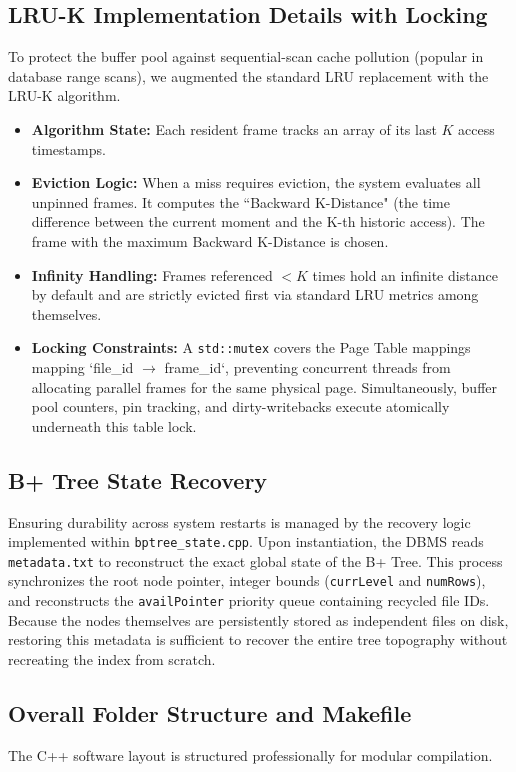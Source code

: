 \documentclass[12pt, a4paper]{article}
\begin{document}
\subsection{LRU-K Implementation Details with Locking}
To protect the buffer pool against sequential-scan cache pollution (popular in database range scans), we augmented the standard LRU replacement with the LRU-K algorithm.
\begin{itemize}
    \item \textbf{Algorithm State:} Each resident frame tracks an array of its last $K$ access timestamps.
    \item \textbf{Eviction Logic:} When a miss requires eviction, the system evaluates all unpinned frames. It computes the ``Backward K-Distance" (the time difference between the current moment and the K-th historic access). The frame with the maximum Backward K-Distance is chosen.
    \item \textbf{Infinity Handling:} Frames referenced $< K$ times hold an infinite distance by default and are strictly evicted first via standard LRU metrics among themselves.
    \item \textbf{Locking Constraints:} A \texttt{std::mutex} covers the Page Table mappings mapping `file\_id $\to$ frame\_id`, preventing concurrent threads from allocating parallel frames for the same physical page. Simultaneously, buffer pool counters, pin tracking, and dirty-writebacks execute atomically underneath this table lock.
\end{itemize}

\subsection{B+ Tree State Recovery}
Ensuring durability across system restarts is managed by the recovery logic implemented within \texttt{bptree\_state.cpp}. Upon instantiation, the DBMS reads \texttt{metadata.txt} to reconstruct the exact global state of the B+ Tree. This process synchronizes the root node pointer, integer bounds (\texttt{currLevel} and \texttt{numRows}), and reconstructs the \texttt{availPointer} priority queue containing recycled file IDs. Because the nodes themselves are persistently stored as independent files on disk, restoring this metadata is sufficient to recover the entire tree topography without recreating the index from scratch.

\subsection{Overall Folder Structure and Makefile}
The C++ software layout is structured professionally for modular compilation. 
\end{document}
